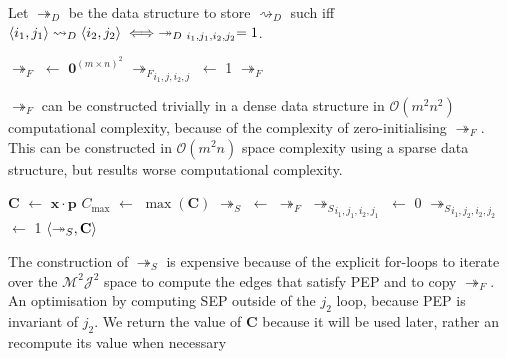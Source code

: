\begin{definition}
	\label{tensorfixeddecisionframework}
	
	Let $\twoheadrightarrow_D$ be the data structure to store $\rightsquigarrow_D$ such iff $\pair{i_1}{j_1}\rightsquigarrow_D\pair{i_2}{j_2}\iff\twoheadrightarrow_{D\ i_1,j_1,i_2,j_2}=1$.
\end{definition}

\begin{algorithm}[H]
	\caption{}
	\begin{algorithmic}[1]
			\State $\twoheadrightarrow_F$ $\gets$ $\mathbf{0}^{(m\times n)^2}$
					\State ${\twoheadrightarrow_F}_{i_1,j,i_2,j}$ $\gets$ 1
				\EndIf
			\EndFor
			\State \Return $\twoheadrightarrow_F$
		\EndFunction
	\end{algorithmic}
\end{algorithm}

$\twoheadrightarrow_F$ can be constructed trivially in a dense data structure in $\mathcal{O}(m^2n^2)$ computational complexity, because of the complexity of zero-initialising $\twoheadrightarrow_F$. This can be constructed in $\mathcal{O}(m^2n)$ space complexity using a sparse data structure, but results worse computational complexity.

\begin{algorithm}[H]
	\caption{}
	\begin{algorithmic}[1]
			\State $\mathbf{C}$ $\gets$ $\mathbf{x}\cdot\mathbf{p}$
			\State $C_{\max}$ $\gets$ $\max(\mathbf{C})$
			\State $\twoheadrightarrow_S$ $\gets$ $\twoheadrightarrow_F$
									\State ${\twoheadrightarrow_S}_{i_1,j_1,i_2,j_1}$ $\gets$ 0
								\EndIf
										\State ${\twoheadrightarrow_S}_{i_1,j_2,i_2,j_2}$ $\gets$ 1
									\EndIf
								\EndFor
							\EndFor
						\EndIf
					\EndFor
				\EndIf
			\EndFor
			\State \Return $\langle{\twoheadrightarrow_S},{\mathbf{C}}\rangle$
		\EndFunction
	\end{algorithmic}
\end{algorithm}

The construction of $\twoheadrightarrow_S$ is expensive because of the explicit for-loops to iterate over the $\mathcal{M}^2\mathcal{J}^2$ space to compute the edges that satisfy PEP and to copy $\twoheadrightarrow_F$. An optimisation by computing SEP outside of the $j_2$ loop, because PEP is invariant of $j_2$. We return the value of $\mathbf{C}$ because it will be used later, rather an recompute its value when necessary

